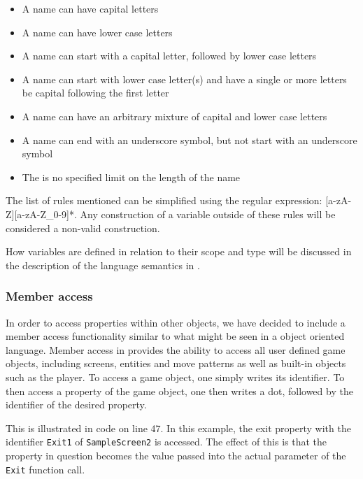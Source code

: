 \begin{itemize}
    \item A name can have capital letters
    \item A name can have lower case letters
    \item A name can start with a capital letter, followed by lower case letters
    \item A name can start with lower case letter(s) and have a single or more letters be capital following the first letter
    \item A name can have an arbitrary mixture of capital and lower case letters
    \item A name can end with an underscore symbol, but not start with an underscore symbol
    \item The is no specified limit on the length of the name
\end{itemize}

The list of rules mentioned can be simplified using the regular expression: [a-zA-Z][a-zA-Z\_0-9]*. Any construction of a variable outside of these rules will be considered
a non-valid construction.

How variables are defined in relation to their scope and type will be discussed in the description of the language semantics in .

\subsubsection*{Member access}
In order to access properties within other objects, we have decided to include a member access functionality similar to what might be seen in a
object oriented language. Member access in \dazel{} provides the ability to access all user defined game objects, including screens, entities and move patterns as well
as built-in objects such as the player. To access a game object, one simply writes its identifier. To then access a property of the game object, one then writes
a dot, followed by the identifier of the desired property.

This is illustrated in code  on line 47. In this example, the exit property with the identifier \texttt{Exit1} of \texttt{SampleScreen2} is accessed.
The effect of this is that the property in question becomes the value passed into the actual parameter of the \texttt{Exit} function call.

